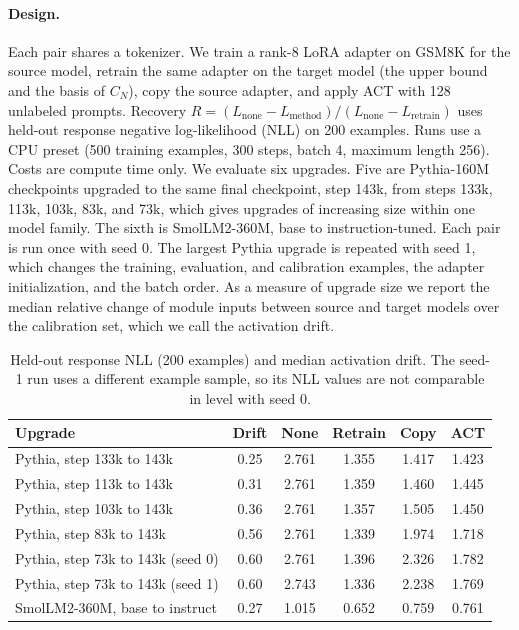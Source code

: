 \documentclass[preprint,12pt,authoryear]{elsarticle}
\begin{document}
\paragraph{Design.} Each pair shares a tokenizer. We train a rank-8 LoRA adapter on GSM8K \citep{cobbe2021gsm8k} for the
source model, retrain the same adapter on the target model (the upper bound and the basis of $C_N$), copy the source adapter,
and apply ACT with 128 unlabeled prompts. Recovery $R=(L_{\text{none}}-L_{\text{method}})/(L_{\text{none}}-L_{\text{retrain}})$
uses held-out response negative log-likelihood (NLL) on 200 examples. Runs use a CPU preset (500 training examples, 300 steps,
batch 4, maximum length 256). Costs are compute time only. We evaluate six upgrades. Five are Pythia-160M checkpoints \citep{biderman2023pythia}
upgraded to the same final checkpoint, step 143k, from steps 133k, 113k, 103k, 83k, and 73k, which gives upgrades of increasing size within one model family. The sixth is SmolLM2-360M, base to instruction-tuned.
Each pair is run once with seed 0. The largest Pythia upgrade is repeated with seed 1, which changes the training, evaluation, and calibration examples, the adapter initialization, and the batch order. As a measure of upgrade size we report the median relative change of
module inputs between source and target models over the calibration set, which we call the activation drift.

\begin{table}[t]
\centering
\caption{Held-out response NLL (200 examples) and median activation drift. The seed-1 run uses a different example sample, so its NLL values are not comparable in level with seed 0.}\label{tab:nll}
\begin{tabular}{lccccc}
\toprule
Upgrade & Drift & None & Retrain & Copy & ACT\\
\midrule
Pythia, step 133k to 143k & 0.25 & 2.761 & 1.355 & 1.417 & 1.423\\
Pythia, step 113k to 143k & 0.31 & 2.761 & 1.359 & 1.460 & 1.445\\
Pythia, step 103k to 143k & 0.36 & 2.761 & 1.357 & 1.505 & 1.450\\
Pythia, step 83k to 143k & 0.56 & 2.761 & 1.339 & 1.974 & 1.718\\
Pythia, step 73k to 143k (seed 0) & 0.60 & 2.761 & 1.396 & 2.326 & 1.782\\
Pythia, step 73k to 143k (seed 1) & 0.60 & 2.743 & 1.336 & 2.238 & 1.769\\
SmolLM2-360M, base to instruct & 0.27 & 1.015 & 0.652 & 0.759 & 0.761\\
\bottomrule
\end{tabular}
\end{table}
\end{document}
